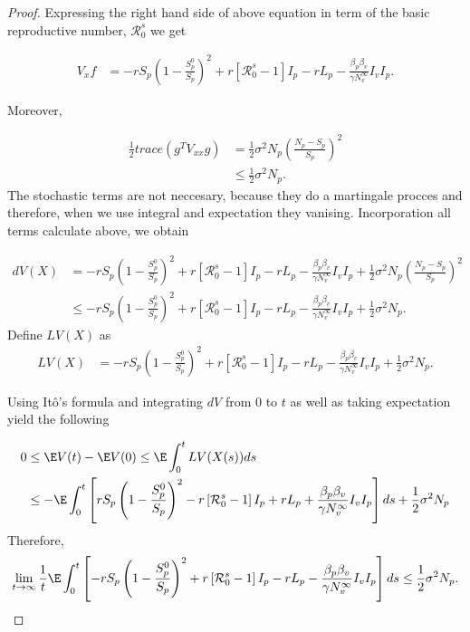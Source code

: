 \begin{proof}
	Expressing the right hand side of above equation in term of the basic reproductive number, $\mathcal{R}^s_0$ we get
	
	\begin{align*}
		V_x f &=
		-rS_p\left(1-\frac{S_p^0}{S_p}\right)^2 + r\left[\mathcal{R}^s_0-1\right]I_p-rL_p-\frac{\beta_p\beta_v}{\gamma N^\infty_v}I_vI_p.
	\end{align*}

	Moreover,
	
	\begin{align*}
		\frac{1}{2}trace(g^TV_{xx}g) 
			&=
				\frac{1}{2} \sigma^2N_p\left(\frac{N_p-S_p}{S_p}\right)^2\\
			&\leq
				\frac{1}{2} \sigma^2 N_p.
	\end{align*}
	The stochastic terms are not neccesary, because they do a martingale procces and therefore, when we use integral and expectation they vanising.
	Incorporation all terms calculate above, we obtain
	
	\begin{align*}
		dV(X) 
			&=
				-rS_p 
				\left(
					1 - \frac{S_p^0}{S_p}
				\right) ^ 2 + 
				r
				\left[
					\mathcal{R} ^ s_0 - 1
				\right] I_p - 
				r L_p - \frac{\beta_p \beta_v}{\gamma N ^ \infty_v} I_v I_p + 
				\frac{1}{2} \sigma ^ 2 N_p
				\left(
					\frac{N_p - S_p}{S_p}
				\right) ^ 2
			\\
			&\leq
				-r S_p 
				\left(
					1 - 
					\frac{S_p ^ 0}{S_p}
				\right) ^ 2 + 
				r
				\left[
					\mathcal{R}^s_0 - 1
				\right] I_p - 
				r L_p - 
				\frac{\beta_p \beta_v }{\gamma N^ \infty_v} I_v I_p + 
				\frac{1}{2} \sigma ^ 2 N_p.
	\end{align*}
	Define $LV(X)$ as
	\begin{align*}
		LV(X) 
			&=
				-rS_p 
				\left(
					1 - \frac{S_p^0}{S_p}
				\right) ^ 2 + 
				r 
				\left[
					\mathcal{R} ^ s_0 - 1
				\right] I_p - 
				r L_p - 
				\frac{\beta_p\beta_v}{\gamma N^\infty_v} I_v I_p + 
				\frac{1}{2} \sigma^2 N_p.
	\end{align*}
	
	Using It\^{o}'s formula and integrating $dV$ from $0$ to $t$ as well as taking expectation yield the following
	
	\begin{align*}
		0 
			& \leq
				\E V(t)- 
				\E V(0)
				\leq 
					\E \int_{0}^{t} L V(X(s)) ds
		\\
			& \leq
				-\E
				\int_{0} ^ {t}
					\left[
						r S_p 
						\left(
							1 - \frac{S_p^0}{S_p}
						\right) ^ 2 - 
						r 
						\left[
							\mathcal{R} ^ s_0 - 1
						\right] I_p + 
						r L_p + 
						\frac{\beta_p\beta_v}{\gamma N ^ \infty_v} I_v I_p
					\right] ds +  
				\frac{1}{2} \sigma ^ 2 N_p
	\end{align*}
	Therefore,
	\begin{align*}
		\lim_{t\to\infty}
		\frac{1}{t} 
		\E \int_{0}^{t}
		\left[
			-r S_p 
			\left(
				1 - 
				\frac{S_p ^ 0}{S_p} 
			\right) ^ 2 + 
			r 
			\left[
				\mathcal{R} ^ s_0 - 1
			\right] I_p - 
			r L_p - 
			\frac{\beta_p \beta_v}{\gamma N^\infty_v}
			I_v I_p 
		\right] ds
		\leq \frac{1}{2}\sigma^2 N_p.
	\end{align*}


\end{proof}
